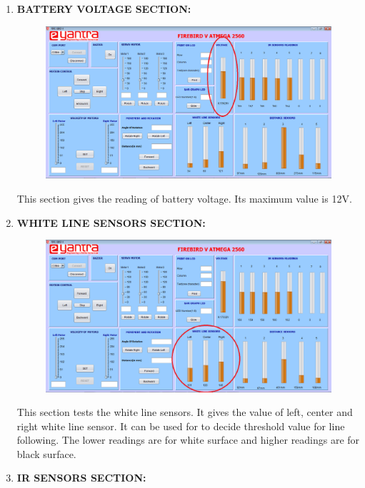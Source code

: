 \documentclass{article}
\begin{document}
\begin{enumerate}
		\item \textbf{BATTERY VOLTAGE SECTION:} \\
		\begin{figure}[h]
			\begin{center}
				\includegraphics[scale=0.4]{batteryvoltage.png}
			\end{center}
		\end{figure}
		This section gives the reading of battery voltage. Its maximum value is 12V. 
		\newpage
		\item \textbf{WHITE LINE SENSORS SECTION:} \\
		\begin{figure}[h]
			\begin{center}
				\includegraphics[scale=0.4]{WLSensor.png}
			\end{center}
		\end{figure}
		This section tests the white line sensors. It gives the value of left, center and right white line sensor. It can be used for to decide threshold value for line following. The lower readings are for white surface and higher readings are for black surface. 
		\item \textbf{IR SENSORS SECTION:} \\

\end{enumerate}
\end{document}
